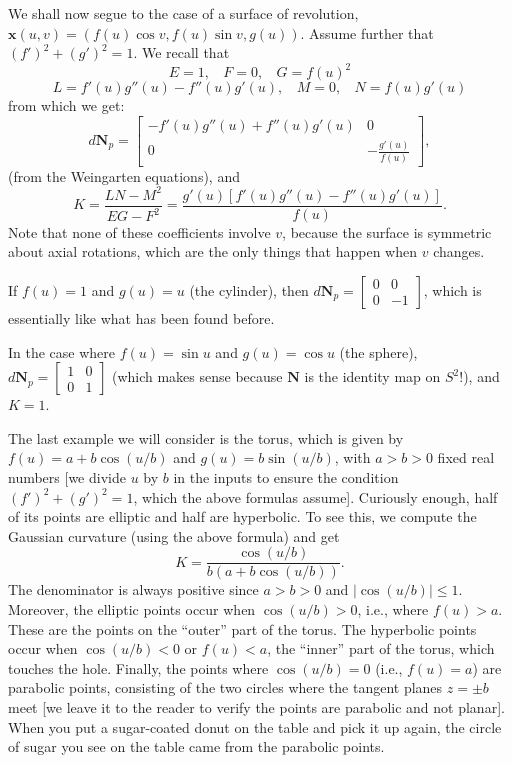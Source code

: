\documentclass[leqno]{book}
\begin{document}
We shall now segue to the case of a surface of revolution,\\
\noindent $\mathbf x(u,v)=(f(u)\cos v,f(u)\sin v,g(u))$.  Assume further that $(f')^2+(g')^2=1$.  We recall that
$$E=1,~~~~F=0,~~~~G=f(u)^2$$
$$L=f'(u)g''(u)-f''(u)g'(u),~~~~M=0,~~~~N=f(u)g'(u)$$
from which we get:
$$d\mathbf N_p=\begin{bmatrix}-f'(u)g''(u)+f''(u)g'(u)&0\\0&-\frac{g'(u)}{f(u)}\end{bmatrix},$$
(from the Weingarten equations), and
$$K=\frac{LN-M^2}{EG-F^2}=\frac{g'(u)[f'(u)g''(u)-f''(u)g'(u)]}{f(u)}.$$
Note that none of these coefficients involve $v$, because the surface is symmetric about axial rotations, which are the only things that happen when $v$ changes.

If $f(u)=1$ and $g(u)=u$ (the cylinder), then $d\mathbf N_p=\begin{bmatrix}0&0\\0&-1\end{bmatrix}$, which is essentially like what has been found before.

In the case where $f(u)=\sin u$ and $g(u)=\cos u$ (the sphere), $d\mathbf N_p=\begin{bmatrix}1&0\\0&1\end{bmatrix}$ (which makes sense because $\mathbf N$ is the identity map on $S^2$!), and $K=1$.

The last example we will consider is the torus, which is given by $f(u)=a+b\cos(u/b)$ and $g(u)=b\sin(u/b)$, with $a>b>0$ fixed real numbers [we divide $u$ by $b$ in the inputs to ensure the condition $(f')^2+(g')^2=1$, which the above formulas assume].  Curiously enough, half of its points are elliptic and half are hyperbolic.  To see this, we compute the Gaussian curvature (using the above formula) and get
$$K=\frac{\cos(u/b)}{b(a+b\cos(u/b))}.$$
The denominator is always positive since $a>b>0$ and $|\cos(u/b)|\leqslant 1$.  Moreover, the elliptic points occur when $\cos(u/b)>0$, i.e., where $f(u)>a$.  These are the points on the ``outer'' part of the torus.  The hyperbolic points occur when $\cos(u/b)<0$ or $f(u)<a$, the ``inner'' part of the torus, which touches the hole.  Finally, the points where $\cos(u/b)=0$ (i.e., $f(u)=a$) are parabolic points, consisting of the two circles where the tangent planes $z=\pm b$ meet [we leave it to the reader to verify the points are parabolic and not planar].  When you put a sugar-coated donut on the table and pick it up again, the circle of sugar you see on the table came from the parabolic points.\\
\end{document}
